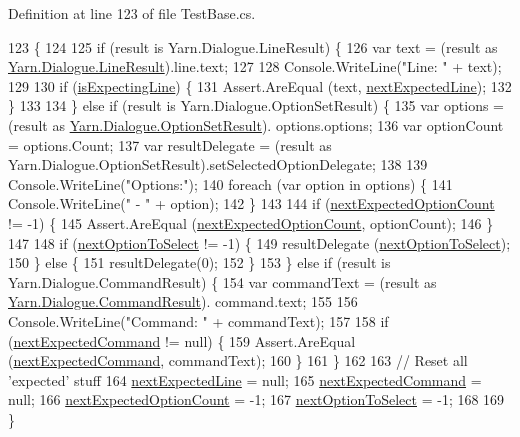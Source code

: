 Definition at line 123 of file Test\-Base.\-cs.


\begin{DoxyCode}
123                                                                        \{
124 
125             \textcolor{keywordflow}{if} (result is Yarn.Dialogue.LineResult) \{
126                 var text = (result as \hyperlink{a00126}{Yarn.Dialogue.LineResult}).line.text;
127 
128                 Console.WriteLine(\textcolor{stringliteral}{"Line: "} + text);
129 
130                 \textcolor{keywordflow}{if} (\hyperlink{a00164_a47f35b8e8123ed9471883d02b8bc9f3e}{isExpectingLine}) \{
131                     Assert.AreEqual (text, \hyperlink{a00164_a3651ffb5425ab15bd1e42749347c1ee7}{nextExpectedLine});
132                 \}
133 
134             \} \textcolor{keywordflow}{else} \textcolor{keywordflow}{if} (result is Yarn.Dialogue.OptionSetResult) \{
135                 var options = (result as \hyperlink{a00139}{Yarn.Dialogue.OptionSetResult}).
      options.options;
136                 var optionCount = options.Count;
137                 var resultDelegate = (result as Yarn.Dialogue.OptionSetResult).setSelectedOptionDelegate;
138 
139                 Console.WriteLine(\textcolor{stringliteral}{"Options:"});
140                 \textcolor{keywordflow}{foreach} (var option \textcolor{keywordflow}{in} options) \{
141                     Console.WriteLine(\textcolor{stringliteral}{" - "} + option);
142                 \}
143 
144                 \textcolor{keywordflow}{if} (\hyperlink{a00164_aaabaf15249efe42f3d857129bdbc2864}{nextExpectedOptionCount} != -1) \{
145                     Assert.AreEqual (\hyperlink{a00164_aaabaf15249efe42f3d857129bdbc2864}{nextExpectedOptionCount}, optionCount);
146                 \}
147 
148                 \textcolor{keywordflow}{if} (\hyperlink{a00164_a343055fa693e9d5dfc1bdbfcd0f02676}{nextOptionToSelect} != -1) \{
149                     resultDelegate (\hyperlink{a00164_a343055fa693e9d5dfc1bdbfcd0f02676}{nextOptionToSelect});
150                 \} \textcolor{keywordflow}{else} \{
151                     resultDelegate(0);
152                 \}
153             \} \textcolor{keywordflow}{else} \textcolor{keywordflow}{if} (result is Yarn.Dialogue.CommandResult) \{
154                 var commandText = (result as \hyperlink{a00046}{Yarn.Dialogue.CommandResult}).
      command.text;
155 
156                 Console.WriteLine(\textcolor{stringliteral}{"Command: "} + commandText);
157 
158                 \textcolor{keywordflow}{if} (\hyperlink{a00164_a26fae5694fc06c3cdb12d3108dbc34de}{nextExpectedCommand} != null) \{
159                     Assert.AreEqual (\hyperlink{a00164_a26fae5694fc06c3cdb12d3108dbc34de}{nextExpectedCommand}, commandText);
160                 \}
161             \}
162 
163             \textcolor{comment}{// Reset all 'expected' stuff}
164             \hyperlink{a00164_a3651ffb5425ab15bd1e42749347c1ee7}{nextExpectedLine} = null;
165             \hyperlink{a00164_a26fae5694fc06c3cdb12d3108dbc34de}{nextExpectedCommand} = null;
166             \hyperlink{a00164_aaabaf15249efe42f3d857129bdbc2864}{nextExpectedOptionCount} = -1;
167             \hyperlink{a00164_a343055fa693e9d5dfc1bdbfcd0f02676}{nextOptionToSelect} = -1;
168 
169         \}
\end{DoxyCode}
